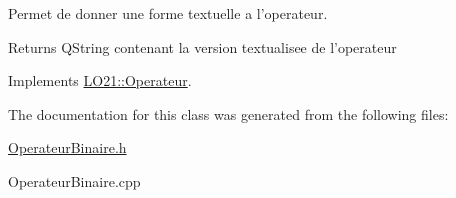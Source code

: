 \-Permet de donner une forme textuelle a l'operateur. 

\begin{DoxyReturn}{\-Returns}
\-Q\-String contenant la version textualisee de l'operateur 
\end{DoxyReturn}


\-Implements \hyperlink{class_l_o21_1_1_operateur_a145a86591719c4c74043b05b21722b6e}{\-L\-O21\-::\-Operateur}.



\-The documentation for this class was generated from the following files\-:\begin{DoxyCompactItemize}
\item 
\hyperlink{_operateur_binaire_8h}{\-Operateur\-Binaire.\-h}\item 
\-Operateur\-Binaire.\-cpp\end{DoxyCompactItemize}
